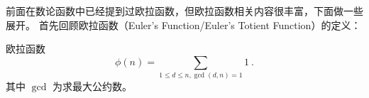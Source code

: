 

前面在数论函数中已经提到过欧拉函数，但欧拉函数相关内容很丰富，下面做一些展开。
首先回顾欧拉函数（Euler's Function/Euler's Totient Function）的定义：
\begin{definition}{欧拉函数}
$$\phi(n) = \sum_{1 \le d \le n, \gcd(d, n) = 1} 1  ~.$$
其中 $\gcd$ 为求最大公约数。
\end{definition}